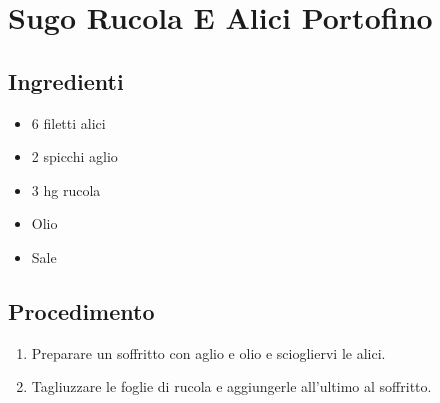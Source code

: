 \section{Sugo Rucola E Alici Portofino}
\subsection{Ingredienti}
\begin{itemize}
\item 6 filetti alici  
\item 2 spicchi aglio  
\item 3 hg rucola  
\item Olio  
\item Sale
\end{itemize}
\subsection{Procedimento}
\begin{enumerate}
\item  Preparare un soffritto con aglio e olio e sciogliervi le alici.  
\item  Tagliuzzare le foglie di rucola e aggiungerle all'ultimo al soffritto.
\end{enumerate}
